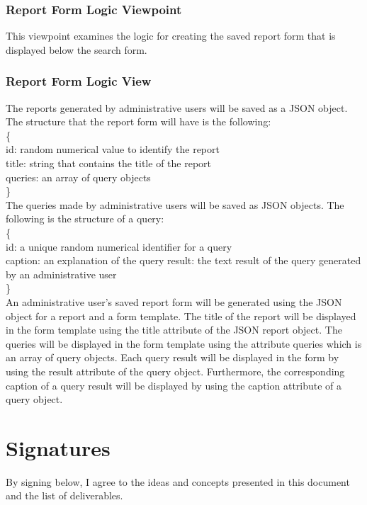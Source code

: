 \subsubsection{Report Form Logic Viewpoint}
This viewpoint examines the logic for creating the saved report form that is displayed below the search form. 

\subsubsection{Report Form Logic View}
The reports generated by administrative users will be saved as a JSON object. The structure that the report form will have is the following:\\
\{ \\
	\indent id: random numerical value to identify the report\\
	\indent title: string that contains the title of the report\\
	\indent queries: an array of query objects\\
	
\} \\
The queries made by administrative users will be saved as JSON objects. The following is the structure of a query:\\
\{\\
	\indent id: a unique random numerical identifier for a query\\
	\indent caption: an explanation of the query 
	\indent result: the text result of the query generated by an administrative user\\
\}\\

An administrative user's saved report form will be generated using the JSON object for a report and a form template. The title of the report will be displayed in the form template using the title attribute of the JSON report object. The queries will be displayed in the form template using the attribute queries which is an array of query objects. Each query result will be displayed in the form by using the result attribute of the query object. Furthermore, the corresponding caption of a query result will be displayed by using the caption attribute of a query object. 

\newpage

\section{Signatures}
By signing below, I agree to the ideas and concepts presented in this document and the list of deliverables. \\
\vspace{.2in}
\vspace{.2in}
\vspace{.2in}








